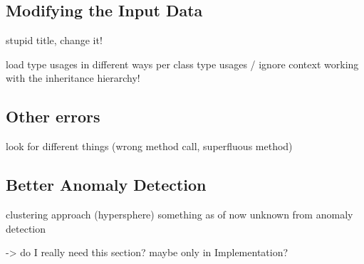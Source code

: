 \subsection{Modifying the Input Data}
stupid title, change it!

load type usages in different ways
    per class type usages / ignore context
    working with the inheritance hierarchy!

\subsection{Other errors}
    look for different things (wrong method call, superfluous method)

\subsection{Better Anomaly Detection}
    clustering approach (hypersphere)
    something as of now unknown from anomaly detection

    -> do I really need this section? maybe only in Implementation?

